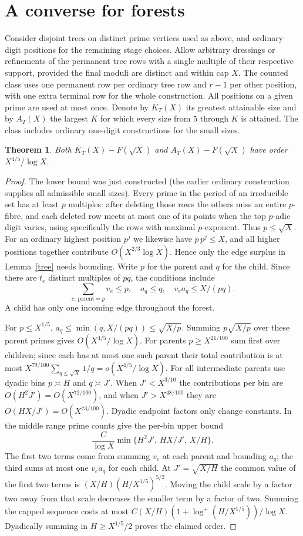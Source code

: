 \documentclass[11pt]{article}
\newtheorem{theorem}{Theorem}
\begin{document}
\section{A converse for forests}
Consider disjoint trees on distinct prime vertices used as above, and ordinary digit positions for the remaining stage choices. Allow arbitrary dressings or refinements of the permanent tree rows with a single multiple of their respective support, provided the final moduli are distinct and within cap $X$. The counted class uses one permanent row per ordinary tree row and $r-1$ per other position, with one extra terminal row for the whole construction. All positions on a given prime are used at most once. Denote by $K_T(X)$ its greatest attainable size and by $A_T(X)$ the largest $K$ for which every size from $5$ through $K$ is attained. The class includes ordinary one-digit constructions for the small sizes.
\begin{theorem}\label{cap}
Both $K_T(X)-F(\sqrt X)$ and $A_T(X)-F(\sqrt X)$ have order $X^{4/5}/\log X$.
\end{theorem}
\begin{proof}
The lower bound was just constructed (the earlier ordinary construction supplies all admissible small sizes). Every prime in the period of an irreducible set has at least $p$ multiples: after deleting those rows the others miss an entire $p$-fibre, and each deleted row meets at most one of its points when the top $p$-adic digit varies, using specifically the rows with maximal $p$-exponent. Thus $p\le\sqrt X$. For an ordinary highest position $p^j$ we likewise have $p\,p^j\le X$, and all higher positions together contribute $O(X^{2/3}\log X)$. Hence only the edge surplus in Lemma~\ref{tree} needs bounding. Write $p$ for the parent and $q$ for the child. Since there are $t_e$ distinct multiples of $pq$, the conditions include
\[
  \sum_{e:\,\mathrm{parent}=p}v_e\le p,\quad
  a_q\le q,\quad
  v_ea_q\le X/(pq).
\]
A child has only one incoming edge throughout the forest.

For $p\le X^{1/5}$, $a_q\le\min(q,X/(pq))\le\sqrt{X/p}$. Summing $p\sqrt{X/p}$ over these parent primes gives $O(X^{4/5}/\log X)$. For parents $p\ge X^{21/100}$ sum first over children; since each has at most one such parent their total contribution is at most $X^{79/100}\sum_{q\le\sqrt X}1/q=o(X^{4/5}/\log X)$. For all intermediate parents use dyadic bins $p\asymp H$ and $q\asymp J'$. When $J'<X^{3/10}$ the contributions per bin are $O(H^2J')=O(X^{72/100})$, and when $J'>X^{48/100}$ they are $O(HX/J')=O(X^{73/100})$. Dyadic endpoint factors only change constants. In the middle range prime counts give the per-bin upper bound
\[
 \frac{C}{\log X}\min\{H^2J',\,HX/J',\,X/H\}.
\]
The first two terms come from summing $v_e$ at each parent and bounding $a_q$; the third sums at most one $v_ea_q$ for each child. At $J'=\sqrt{X/H}$ the common value of the first two terms is $(X/H)(H/X^{1/5})^{5/2}$. Moving the child scale by a factor two away from that scale decreases the smaller term by a factor of two. Summing the capped sequence costs at most $C(X/H)(1+\log^+(H/X^{1/5}))/\log X$. Dyadically summing in $H\ge X^{1/5}/2$ proves the claimed order.
\end{proof}
\end{document}
